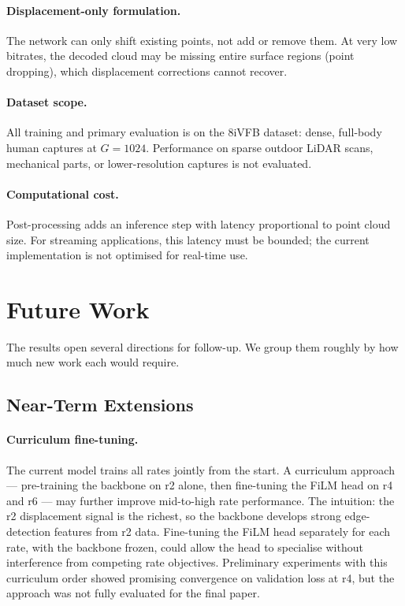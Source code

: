 \paragraph{Displacement-only formulation.}
The network can only shift existing points, not add or remove them.
At very low bitrates, the decoded cloud may be missing entire surface regions
(point dropping), which displacement corrections cannot recover.

\paragraph{Dataset scope.}
All training and primary evaluation is on the 8iVFB dataset: dense,
full-body human captures at $G=1024$.
Performance on sparse outdoor LiDAR scans, mechanical parts, or lower-resolution
captures is not evaluated.

\paragraph{Computational cost.}
Post-processing adds an inference step with latency proportional to point
cloud size.
For streaming applications, this latency must be bounded; the current
implementation is not optimised for real-time use.

\section{Future Work}
\label{sec:future-work}

The results open several directions for follow-up.
We group them roughly by how much new work each would require.

\subsection*{Near-Term Extensions}

\paragraph{Curriculum fine-tuning.}
The current model trains all rates jointly from the start.
A curriculum approach --- pre-training the backbone on r2 alone, then
fine-tuning the FiLM head on r4 and r6 --- may further improve mid-to-high
rate performance.
The intuition: the r2 displacement signal is the richest, so the backbone
develops strong edge-detection features from r2 data.
Fine-tuning the FiLM head separately for each rate, with the backbone frozen,
could allow the head to specialise without interference from competing
rate objectives.
Preliminary experiments with this curriculum order showed promising
convergence on validation loss at r4, but the approach was not fully evaluated
for the final paper.

